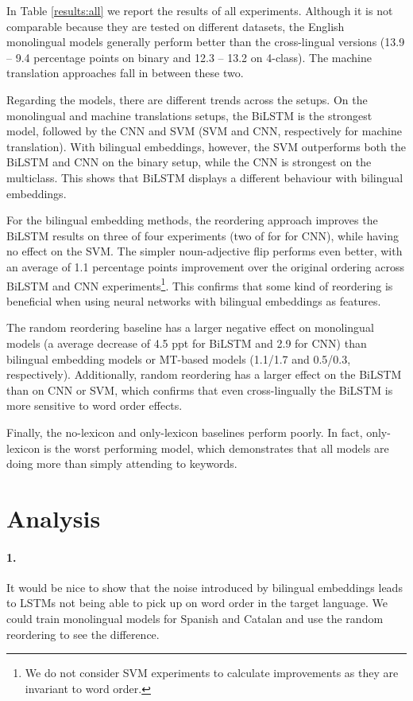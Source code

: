 \documentclass[11pt,a4paper]{article}
\begin{document}
In Table \ref{results:all} we report the results of all experiments. Although it is not comparable because they are tested on different datasets, the English monolingual models generally perform better than the cross-lingual versions (13.9 -- 9.4 percentage points on binary and 12.3 -- 13.2 on 4-class). The machine translation approaches fall in between these two.

Regarding the models, there are different trends across the setups. On the monolingual and machine translations setups, the BiLSTM is the strongest model, followed by the CNN and SVM (SVM and CNN, respectively for machine translation). With bilingual embeddings, however, the SVM outperforms both the BiLSTM and CNN on the binary setup, while the CNN is strongest on the multiclass. This shows that BiLSTM displays a different behaviour with bilingual embeddings.

For the bilingual embedding methods, the reordering approach improves the BiLSTM results on three of four experiments (two of for for CNN), while having no effect on the SVM. The simpler noun-adjective flip performs even better, with an average of 1.1 percentage points improvement over the original ordering across BiLSTM and CNN experiments\footnote{We do not consider SVM experiments to calculate improvements as they are invariant to word order.}. This confirms that some kind of reordering is beneficial when using neural networks with bilingual embeddings as features.

The random reordering baseline has a larger negative effect on monolingual models (a average decrease of 4.5 ppt for BiLSTM and 2.9 for CNN) than bilingual embedding models or MT-based models (1.1/1.7 and 0.5/0.3, respectively). Additionally, random reordering has a larger effect on the BiLSTM than on CNN or SVM, which confirms that even cross-lingually the BiLSTM is more sensitive to word order effects.

Finally, the no-lexicon and only-lexicon baselines perform poorly. In fact, only-lexicon is the worst performing model, which demonstrates that all models are doing more than simply attending to keywords.



\section{Analysis}

\paragraph{1. }It would be nice to show that 
the noise introduced by bilingual 
embeddings leads to LSTMs not 
being able to pick up on word 
order in the target language.
We could train monolingual models 
for Spanish and Catalan and use the 
random reordering to see the 
difference.
\end{document}
